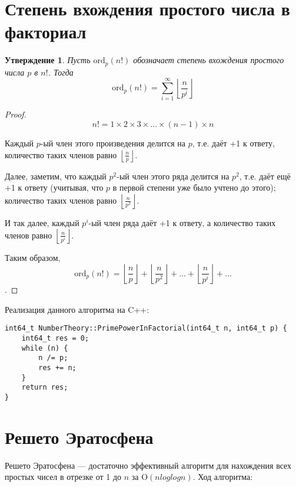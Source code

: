 \documentclass[12pt, a4paper, openany]{book}
\newtheorem*{statement}{Утверждение}
\begin{document}
\section{Степень вхождения простого числа в факториал}

\begin{statement}
Пусть $\text{ord}_p(n!)$ обозначает степень вхождения простого числа $p$ в $n!$. Тогда
\[\text{ord}_p(n!) = \sum_{i=1}^{\infty} \left\lfloor \frac{n}{p^i} \right\rfloor\]
\end{statement}

\begin{proof}
\[n! = 1 \times 2 \times 3 \times \ldots \times (n-1) \times n\]

Каждый $p$-ый член этого произведения делится на $p$, т.е. даёт +1 к ответу, количество таких членов равно $\left\lfloor \frac{n}{p} \right\rfloor.$

Далее, заметим, что каждый $p^2$-ый член этого ряда делится на $p^2$, т.е. даёт ещё +1 к ответу (учитывая, что $p$ в первой степени уже было учтено до этого); количество таких членов равно $\left\lfloor \frac{n}{p^2} \right\rfloor$.

И так далее, каждый $p^i$-ый член ряда даёт +1 к ответу, а количество таких членов равно $\left\lfloor \frac{n}{p^i} \right\rfloor.$

Таким образом, \[\text{ord}_p(n!) = \left\lfloor\frac{n}{p}\right\rfloor + \left\lfloor\frac{n}{p^2}\right\rfloor + \ldots + \left\lfloor\frac{n}{p^i}\right\rfloor + \ldots\].
\end{proof}

\newpage

\noindent
Реализация данного алгоритма на C++:
\begin{lstlisting}[breaklines=true]
int64_t NumberTheory::PrimePowerInFactorial(int64_t n, int64_t p) {
	int64_t res = 0;
	while (n) {
		n /= p;
		res += n;
	}
	return res;
}
\end{lstlisting}

\section{Решето Эратосфена}

Решето Эратосфена --- достаточно эффективный алгоритм для нахождения всех простых чисел в отрезке от 1 до $n$ за $\text{O}(nloglogn)$. Ход алгоритма:
\end{document}
